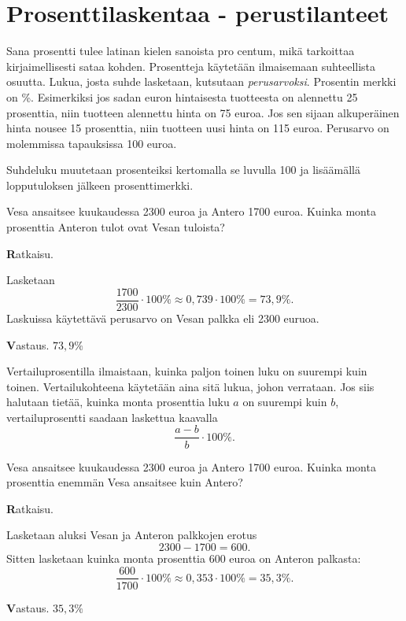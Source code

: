 \chapter{Prosenttilaskentaa - perustilanteet}

Sana prosentti tulee latinan kielen sanoista pro centum, mikä tarkoittaa
kirjaimellisesti sataa kohden. Prosentteja käytetään ilmaisemaan suhteellista
osuutta. Lukua, josta suhde lasketaan, kutsutaan \emph{perusarvoksi}. Prosentin
merkki on \%. Esimerkiksi jos sadan euron hintaisesta tuotteesta on alennettu 25
prosenttia, niin tuotteen alennettu hinta on 75 euroa. Jos sen sijaan alkuperäinen
hinta nousee 15 prosenttia, niin tuotteen uusi hinta on 115 euroa. Perusarvo on
molemmissa tapauksissa 100 euroa.



Suhdeluku muutetaan prosenteiksi kertomalla se luvulla 100 ja lisäämällä
lopputuloksen jälkeen prosenttimerkki.

\begin{esimerkki}
Vesa ansaitsee kuukaudessa 2300 euroa ja Antero 1700 euroa.
    Kuinka monta prosenttia Anteron tulot ovat Vesan tuloista? 
    
    {\textbf Ratkaisu.}
    
    Lasketaan
    \[
    \frac{1700}{2300} \cdot 100 \% \approx 0,739\cdot 100 \% = 73,9 \%.
    \]
    Laskuissa käytettävä perusarvo on Vesan palkka eli 2300 euruoa.
    
    {\textbf Vastaus.}
     $73,9 \%$
\end{esimerkki}


Vertailuprosentilla ilmaistaan, kuinka paljon toinen luku on suurempi kuin toinen. Vertailukohteena käytetään aina sitä lukua, johon verrataan. Jos siis halutaan tietää, kuinka monta prosenttia luku $a$ on suurempi kuin $b$, vertailuprosentti saadaan laskettua kaavalla
\[
\frac{a-b}{b} \cdot 100 \%.
\]

\begin{esimerkki}
    Vesa ansaitsee kuukaudessa 2300 euroa ja Antero 1700 euroa.
    Kuinka monta prosenttia enemmän Vesa ansaitsee kuin Antero?
    
    {\textbf Ratkaisu.}
    
    Lasketaan aluksi Vesan ja Anteron palkkojen erotus
    \[
    2300-1700 = 600.
    \]
    Sitten lasketaan kuinka monta prosenttia 600 euroa on Anteron palkasta:
    \[
    \frac{600}{1700} \cdot 100 \% \approx 0,353\cdot 100\% = 35,3 \%.
    \]
    
    {\textbf Vastaus.}
    $35,3 \%$
\end{esimerkki}


